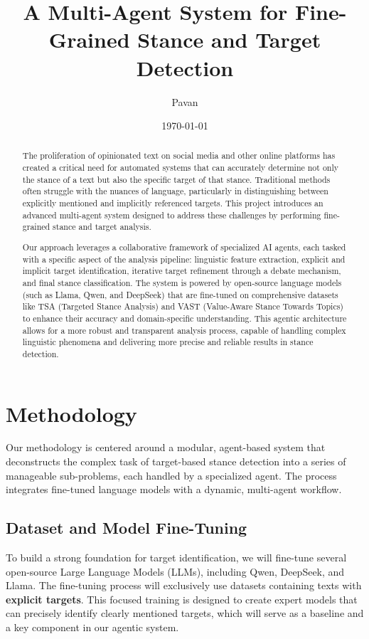\documentclass{article}
\title{A Multi-Agent System for Fine-Grained Stance and Target Detection}
\author{Pavan}
\date{\today}
\begin{document}
\maketitle

\begin{abstract}
The proliferation of opinionated text on social media and other online platforms has created a critical need for automated systems that can accurately determine not only the stance of a text but also the specific target of that stance. Traditional methods often struggle with the nuances of language, particularly in distinguishing between explicitly mentioned and implicitly referenced targets. This project introduces an advanced multi-agent system designed to address these challenges by performing fine-grained stance and target analysis.

Our approach leverages a collaborative framework of specialized AI agents, each tasked with a specific aspect of the analysis pipeline: linguistic feature extraction, explicit and implicit target identification, iterative target refinement through a debate mechanism, and final stance classification. The system is powered by open-source language models (such as Llama, Qwen, and DeepSeek) that are fine-tuned on comprehensive datasets like TSA (Targeted Stance Analysis) and VAST (Value-Aware Stance Towards Topics) to enhance their accuracy and domain-specific understanding. This agentic architecture allows for a more robust and transparent analysis process, capable of handling complex linguistic phenomena and delivering more precise and reliable results in stance detection.
\end{abstract}

\section{Methodology}
Our methodology is centered around a modular, agent-based system that deconstructs the complex task of target-based stance detection into a series of manageable sub-problems, each handled by a specialized agent. The process integrates fine-tuned language models with a dynamic, multi-agent workflow.

\subsection{Dataset and Model Fine-Tuning}
To build a strong foundation for target identification, we will fine-tune several open-source Large Language Models (LLMs), including Qwen, DeepSeek, and Llama. The fine-tuning process will exclusively use datasets containing texts with \textbf{explicit targets}. This focused training is designed to create expert models that can precisely identify clearly mentioned targets, which will serve as a baseline and a key component in our agentic system.
\end{document}
